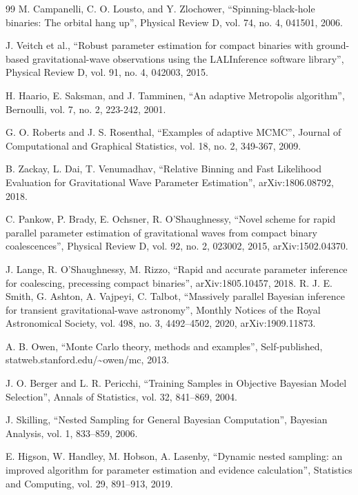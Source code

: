 \documentclass[12pt]{article}
\begin{document}
\begin{thebibliography}{99}
  M. Campanelli, C. O. Lousto, and Y. Zlochower,
  ``Spinning-black-hole binaries: The orbital hang up'',
  Physical Review D, vol. 74, no. 4, 041501, 2006.



  J. Veitch et al.,
  ``Robust parameter estimation for compact binaries with ground-based gravitational-wave observations using the LALInference software library'',
  Physical Review D, vol. 91, no. 4, 042003, 2015.

  H. Haario, E. Saksman, and J. Tamminen,
  ``An adaptive Metropolis algorithm'',
  Bernoulli, vol. 7, no. 2, 223-242, 2001.

  G. O. Roberts and J. S. Rosenthal,
  ``Examples of adaptive MCMC'',
  Journal of Computational and Graphical Statistics, vol. 18, no. 2, 349-367, 2009.


  B. Zackay, L. Dai, T. Venumadhav,
  ``Relative Binning and Fast Likelihood Evaluation for Gravitational Wave Parameter Estimation'',
  arXiv:1806.08792, 2018.

  C. Pankow, P. Brady, E. Ochsner, R. O'Shaughnessy,
  ``Novel scheme for rapid parallel parameter estimation of gravitational waves from compact binary coalescences'',
  Physical Review D, vol. 92, no. 2, 023002, 2015,
  arXiv:1502.04370.


  J. Lange, R. O'Shaughnessy, M. Rizzo,
  ``Rapid and accurate parameter inference for coalescing, precessing compact binaries'',
  arXiv:1805.10457, 2018.
  R. J. E. Smith, G. Ashton, A. Vajpeyi, C. Talbot,
  ``Massively parallel Bayesian inference for transient gravitational-wave astronomy'',
  Monthly Notices of the Royal Astronomical Society, vol. 498, no. 3, 4492--4502, 2020,
  arXiv:1909.11873.

  A. B. Owen,
  ``Monte Carlo theory, methods and examples'',
  Self-published, statweb.stanford.edu/\textasciitilde{}owen/mc, 2013.

  J. O. Berger and L. R. Pericchi,
  ``Training Samples in Objective Bayesian Model Selection'',
  Annals of Statistics, vol. 32, 841--869, 2004.

  J. Skilling,
  ``Nested Sampling for General Bayesian Computation'',
  Bayesian Analysis, vol. 1, 833--859, 2006.

  E. Higson, W. Handley, M. Hobson, A. Lasenby,
  ``Dynamic nested sampling: an improved algorithm for parameter estimation and evidence calculation'',
  Statistics and Computing, vol. 29, 891--913, 2019.


\end{thebibliography}
\end{document}
